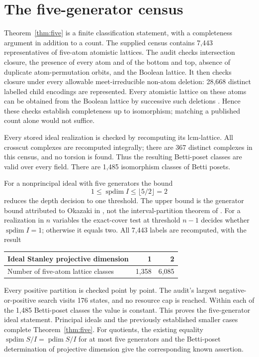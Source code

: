 \documentclass[11pt,a4paper]{article}
\theoremstyle{remark}\newtheorem{remark}[theorem]{Remark}
\DeclareMathOperator{\spdim}{spdim}
\DeclareMathOperator{\pdim}{pdim}
\begin{document}
\section{The five-generator census}\label{sec:census}
Theorem~\ref{thm:five} is a finite classification statement, with a completeness argument in addition to a count. The supplied census contains 7,443 representatives of five-atom atomistic lattices. The audit checks intersection closure, the presence of every atom and of the bottom and top, absence of duplicate atom-permutation orbits, and the Boolean lattice. It then checks closure under every allowable meet-irreducible non-atom deletion: 28,668 distinct labelled child encodings are represented. Every atomistic lattice on these atoms can be obtained from the Boolean lattice by successive such deletions \cite[Algorithm 3.1 and its justification]{IKMF2016}. Hence these checks establish completeness up to isomorphism; matching a published count alone would not suffice.

Every stored ideal realization is checked by recomputing its lcm-lattice. All crosscut complexes are recomputed integrally; there are 367 distinct complexes in this census, and no torsion is found. Thus the resulting Betti-poset classes are valid over every field. There are 1,485 isomorphism classes of Betti posets.

For a nonprincipal ideal with five generators the bound
\[
1\le\spdim I\le\lfloor5/2\rfloor=2
\]
reduces the depth decision to one threshold. The upper bound is the generator bound attributed to Okazaki in \cite[Proposition 5.2]{IKMF2017}, not the interval-partition theorem of \cite{HVZ}. For a realization in $n$ variables the exact-cover test at threshold $n-1$ decides whether $\spdim I=1$; otherwise it equals two. All 7,443 labels are recomputed, with the result
\begin{center}
\begin{tabular}{lrr}\toprule
Ideal Stanley projective dimension&1&2\\\midrule
Number of five-atom lattice classes&1,358&6,085\\\bottomrule
\end{tabular}
\end{center}
Every positive partition is checked point by point. The audit's largest negative-or-positive search visits 176 states, and no resource cap is reached. Within each of the 1,485 Betti-poset classes the value is constant. This proves the five-generator ideal statement. Principal ideals and the previously established smaller cases complete Theorem~\ref{thm:five}. For quotients, the existing equality $\spdim S/I=\pdim S/I$ for at most five generators and the Betti-poset determination of projective dimension give the corresponding known assertion.
\end{document}
